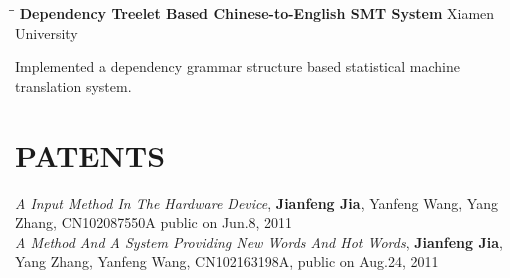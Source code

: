 \documentclass{res}
\begin{document}
\begin{resume}
\begin{tabbing}
   \hspace{2in}\= \hspace{3in}\= \kill %
    {\bf Dependency Treelet Based Chinese-to-English SMT System} \> \>Xiamen University\\
   \end{tabbing}\vspace{-30pt}      %
   Implemented a dependency grammar structure based statistical machine translation system. \\
   \vspace{-0.1in}	


\section{PATENTS}
\emph{A Input Method In The Hardware Device}, \textbf{Jianfeng Jia}, Yanfeng Wang, Yang Zhang, CN102087550A public on Jun.8, 2011\\
\emph{A Method And A System Providing New Words And Hot Words}, \textbf{Jianfeng Jia}, Yang Zhang, Yanfeng Wang, CN102163198A, public on Aug.24, 2011 \\



\end{resume}
\end{document}
